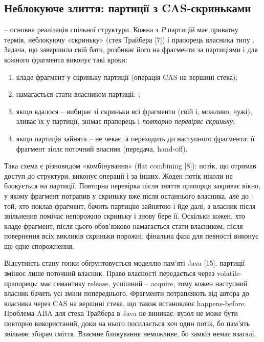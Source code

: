 \subsection{Неблокуюче злиття: партиції з CAS-скриньками}

 -- основна реалізація спільної структури. Кожна з $P$ партицій
має приватну  термів, неблокуючу «скриньку» (стек Трайбера [7]) і прапорець
власника  типу . Задача, що завершила свій батч, розбиває його
на фрагменти за партиціями і для кожного фрагмента виконує такі кроки:
\begin{enumerate}[label=\arabic*)]
\item кладе фрагмент у скриньку партиції (операція CAS на вершині стека);
\item намагається стати власником партиції: ;
\item якщо вдалося -- вибирає зі скриньки всі фрагменти (свій і, можливо, чужі), зливає їх
у  партиції, знімає прапорець і \textit{повторно перевіряє скриньку};
\item якщо партиція зайнята -- не чекає, а переходить до наступного фрагмента: її фрагмент
зіллє поточний власник (передача, hand-off).
\end{enumerate}

Така схема є різновидом «комбінування» (flat combining [8]): потік, що отримав доступ до
структури, виконує операції і за інших. Жоден потік ніколи не блокується на партиції.
Повторна перевірка після зняття прапорця закриває вікно, у якому фрагмент потрапив у скриньку
вже після останнього  власника, але до : той, хто поклав
фрагмент, бачить партицію зайнятою і йде далі, а власник після звільнення помічає непорожню
скриньку і знову бере її. Оскільки кожен, хто кладе фрагмент, після цього обов'язково
намагається стати власником, після повернення всіх викликів  скриньки
порожні; фінальна фаза для певності виконує ще одне спорожнення.

Відсутність стану гонки обґрунтовується моделлю пам'яті Java [15].  партиції
змінює лише поточний власник. Право власності передається через volatile-прапорець:
 має семантику release, успішний  -- acquire, тому
кожен наступний власник бачить усі зміни попереднього. Фрагменти потрапляють від автора до
власника через CAS на вершині стека, що також встановлює happens-before. Проблема ABA для
стека Трайбера в Java не виникає: вузол не може бути повторно використаний, доки на нього
посилається хоч один потік, бо пам'ять звільняє збирач сміття. Взаємне блокування
неможливе, бо замків немає взагалі.

